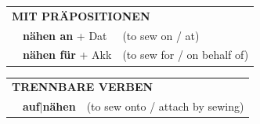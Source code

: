 \documentclass[10pt,a4paper]{revtex4-2}
\begin{document}
\begin{verbbox}
\vspace{10pt}

\begin{tabular}{lll}
\multicolumn{3}{l}{\textbf{MIT PRÄPOSITIONEN}}\\
& \textbf{nähen an} + Dat & (to sew on / at)\\
& \textbf{nähen für} + Akk & (to sew for / on behalf of)\\
\end{tabular}
\hfill
\begin{tabular}{lll}
\multicolumn{3}{l}{\textbf{TRENNBARE VERBEN}}\\
& \textbf{auf$|$nähen} & (to sew onto / attach by sewing)\\
\end{tabular}
\vspace{-5pt}
\end{verbbox}
\end{document}
